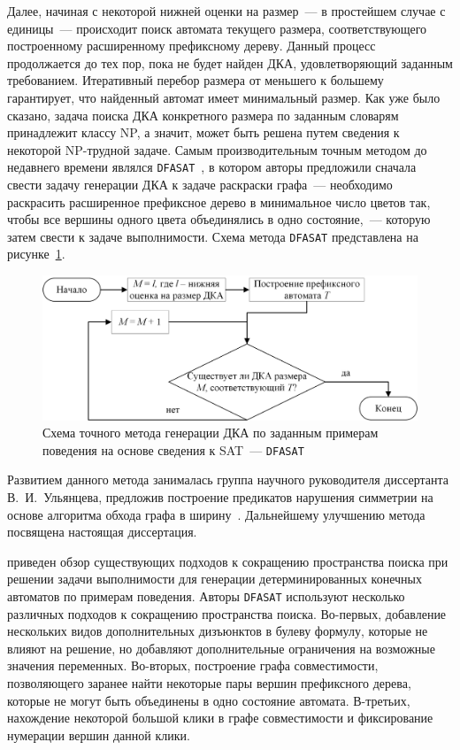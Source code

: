 Далее, начиная с некоторой нижней оценки на размер~--- в простейшем случае с единицы~--- происходит поиск автомата текущего размера, соответствующего построенному расширенному префиксному дереву. 
Данный процесс продолжается до тех пор, пока не будет найден ДКА, удовлетворяющий заданным требованием.
Итеративный перебор размера от меньшего к большему гарантирует, что найденный автомат имеет минимальный размер.
Как уже было сказано, задача поиска ДКА конкретного размера по заданным словарям принадлежит классу NP, а значит, может быть решена путем сведения к некоторой NP-трудной задаче.
Самым производительным точным методом до недавнего времени являлся \texttt{DFASAT}~\cite{heule-icgi10}, в котором авторы предложили сначала свести задачу генерации ДКА к задаче раскраски графа~--- необходимо раскрасить расширенное префиксное дерево в минимальное число цветов так, чтобы все вершины одного цвета объединялись в одно состояние,~--- которую затем свести к задаче выполнимости.
Схема метода \texttt{DFASAT} представлена на рисунке~\ref{syn:img:dfasat-algo}.

\begin{figure}[ht]
  \centering
  \includegraphics[scale=0.5]{img/ntv/basic.jpg}
  \caption{Схема точного метода генерации ДКА по заданным примерам поведения на основе сведения к SAT~--- \texttt{DFASAT}}
  \label{syn:img:dfasat-algo}
\end{figure}

Развитием данного метода занималась группа научного руководителя диссертанта В.~И.~Ульянцева, предложив построение предикатов нарушения симметрии на основе алгоритма обхода графа в ширину~\cite{zakirzyanov2015LATA}.
Дальнейшему улучшению метода посвящена настоящая диссертация.

\insection{\ref{sec:review:sym-breaking}} приведен обзор существующих подходов к сокращению пространства поиска при решении задачи выполнимости для генерации детерминированных конечных автоматов по примерам поведения.
Авторы \texttt{DFASAT} используют несколько различных подходов к сокращению пространства поиска. 
Во-первых, добавление нескольких видов дополнительных дизъюнктов в булеву формулу, которые не влияют на решение, но добавляют дополнительные ограничения на возможные значения переменных.
Во-вторых, построение графа совместимости, позволяющего заранее найти некоторые пары вершин префиксного дерева, которые не могут быть объединены в одно состояние автомата.
В-третьих, нахождение некоторой большой клики в графе совместимости и фиксирование нумерации вершин данной клики.

